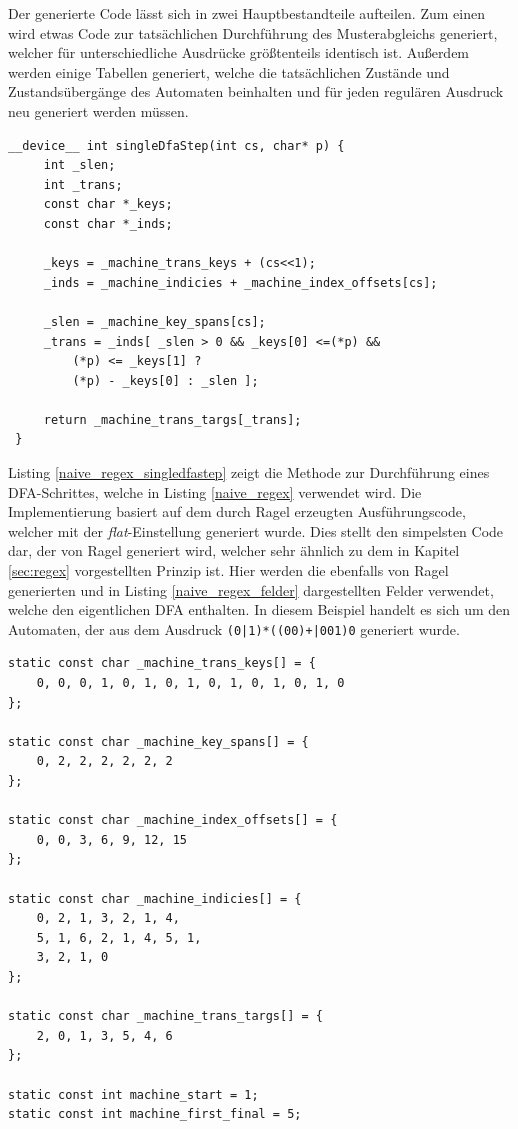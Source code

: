 Der generierte Code lässt sich in zwei Hauptbestandteile aufteilen.
Zum einen wird etwas Code zur tatsächlichen Durchführung des Musterabgleichs generiert, welcher für unterschiedliche Ausdrücke größtenteils identisch ist.
Außerdem werden einige Tabellen generiert, welche die tatsächlichen Zustände und Zustandsübergänge des Automaten beinhalten und für jeden regulären Ausdruck neu generiert werden müssen.

 \begin{lstlisting}[language=MyC++,
 caption=Methode zur Durchführung eines DFA-Schrittes,
 label=naive_regex_singledfastep]
 __device__ int singleDfaStep(int cs, char* p) {
	 int _slen;
	 int _trans;
	 const char *_keys;
	 const char *_inds;
	 
	 _keys = _machine_trans_keys + (cs<<1);
	 _inds = _machine_indicies + _machine_index_offsets[cs];
	 
	 _slen = _machine_key_spans[cs];
	 _trans = _inds[ _slen > 0 && _keys[0] <=(*p) &&
		 (*p) <= _keys[1] ?
		 (*p) - _keys[0] : _slen ];
	 
	 return _machine_trans_targs[_trans];
 }
 \end{lstlisting}
 
 Listing \ref{naive_regex_singledfastep} zeigt die Methode zur Durchführung eines DFA-Schrittes, welche in Listing \ref{naive_regex} verwendet wird.
 Die Implementierung basiert auf dem durch Ragel erzeugten Ausführungscode, welcher mit der \emph{flat}-Einstellung generiert wurde.
 Dies stellt den simpelsten Code dar, der von Ragel generiert wird, welcher sehr ähnlich zu dem in Kapitel \ref{sec:regex} vorgestellten Prinzip ist.
 Hier werden die ebenfalls von Ragel generierten und in Listing \ref{naive_regex_felder} dargestellten Felder verwendet, welche den eigentlichen DFA enthalten.
 In diesem Beispiel handelt es sich um den Automaten, der aus dem Ausdruck \texttt{(0|1)*((00)+|001)0} generiert wurde.
 
 \newpage
 
 \begin{lstlisting}[language=MyC++,
 caption=Methode zur Durchführung eines DFA-Schrittes,
 label=naive_regex_felder]
static const char _machine_trans_keys[] = {
	0, 0, 0, 1, 0, 1, 0, 1, 0, 1, 0, 1, 0, 1, 0
};

static const char _machine_key_spans[] = {
	0, 2, 2, 2, 2, 2, 2
};

static const char _machine_index_offsets[] = {
	0, 0, 3, 6, 9, 12, 15
};

static const char _machine_indicies[] = {
	0, 2, 1, 3, 2, 1, 4, 
	5, 1, 6, 2, 1, 4, 5, 1, 
	3, 2, 1, 0
};

static const char _machine_trans_targs[] = {
	2, 0, 1, 3, 5, 4, 6
};

static const int machine_start = 1;
static const int machine_first_final = 5;
\end{lstlisting}
 
